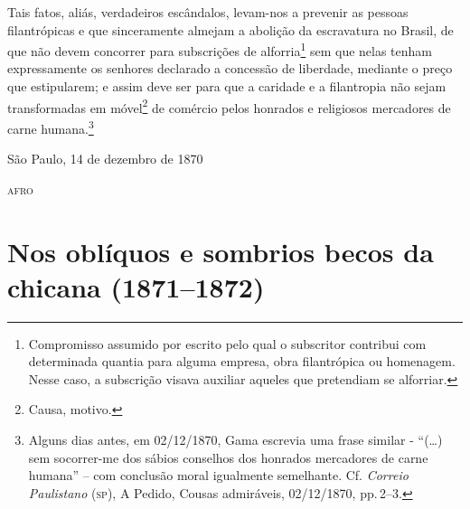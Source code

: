 Tais fatos, aliás, verdadeiros escândalos, levam-nos a prevenir as
pessoas filantrópicas e que sinceramente almejam a abolição da
escravatura no Brasil, de que não devem concorrer para subscrições de
alforria\footnote{ Compromisso assumido por escrito pelo qual o
  subscritor contribui com determinada quantia para alguma empresa, obra
  filantrópica ou homenagem. Nesse caso, a subscrição visava auxiliar
  aqueles que pretendiam se alforriar.} sem que nelas tenham
expressamente os senhores declarado a concessão de liberdade, mediante o
preço que estipularem; e assim deve ser para que a caridade e a
filantropia não sejam transformadas em móvel\footnote{ Causa, motivo.}
de comércio pelos honrados e religiosos mercadores de carne
humana.\footnote{ Alguns dias antes, em 02/12/1870, Gama escrevia uma
  frase similar - ``(\ldots{}) sem socorrer-me dos sábios conselhos dos
  honrados mercadores de carne humana'' -- com conclusão moral igualmente
  semelhante. Cf. \emph{Correio Paulistano} (\textsc{sp}), A Pedido, Cousas
  admiráveis, 02/12/1870, pp.\,2--3.}

\begin{flushright}
São Paulo, 14 de dezembro de 1870

\textsc{afro}
\end{flushright}

\part{Nos oblíquos e sombrios becos da chicana (1871--1872)}

